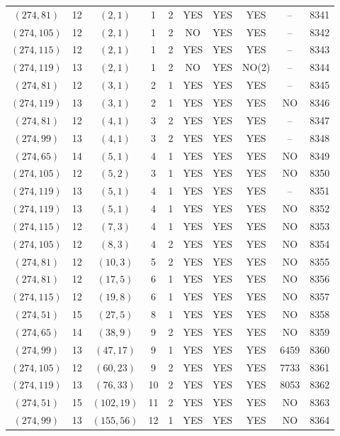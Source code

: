 \begin{longtable}{|c|c|c|c|c|c|c|c|c|c|}
$(274, 81)$ & 12 & $(2, 1)$ & 1 & 2 & YES & YES & YES & -- & 8341\\
$(274, 105)$ & 12 & $(2, 1)$ & 1 & 2 & NO & YES & YES & -- & 8342\\
$(274, 115)$ & 12 & $(2, 1)$ & 1 & 2 & YES & YES & YES & -- & 8343\\
$(274, 119)$ & 13 & $(2, 1)$ & 1 & 2 & NO & YES & NO(2) & -- & 8344\\
$(274, 81)$ & 12 & $(3, 1)$ & 2 & 1 & YES & YES & YES & -- & 8345\\
$(274, 119)$ & 13 & $(3, 1)$ & 2 & 1 & YES & YES & YES & NO & 8346\\
$(274, 81)$ & 12 & $(4, 1)$ & 3 & 2 & YES & YES & YES & -- & 8347\\
$(274, 99)$ & 13 & $(4, 1)$ & 3 & 2 & YES & YES & YES & -- & 8348\\
$(274, 65)$ & 14 & $(5, 1)$ & 4 & 1 & YES & YES & YES & NO & 8349\\
$(274, 105)$ & 12 & $(5, 2)$ & 3 & 1 & YES & YES & YES & NO & 8350\\
$(274, 119)$ & 13 & $(5, 1)$ & 4 & 1 & YES & YES & YES & -- & 8351\\
$(274, 119)$ & 13 & $(5, 1)$ & 4 & 1 & YES & YES & YES & NO & 8352\\
$(274, 115)$ & 12 & $(7, 3)$ & 4 & 1 & YES & YES & YES & NO & 8353\\
$(274, 105)$ & 12 & $(8, 3)$ & 4 & 2 & YES & YES & YES & NO & 8354\\
$(274, 81)$ & 12 & $(10, 3)$ & 5 & 2 & YES & YES & YES & NO & 8355\\
$(274, 81)$ & 12 & $(17, 5)$ & 6 & 1 & YES & YES & YES & NO & 8356\\
$(274, 115)$ & 12 & $(19, 8)$ & 6 & 1 & YES & YES & YES & NO & 8357\\
$(274, 51)$ & 15 & $(27, 5)$ & 8 & 1 & YES & YES & YES & NO & 8358\\
$(274, 65)$ & 14 & $(38, 9)$ & 9 & 2 & YES & YES & YES & NO & 8359\\
$(274, 99)$ & 13 & $(47, 17)$ & 9 & 1 & YES & YES & YES & 6459 & 8360\\
$(274, 105)$ & 12 & $(60, 23)$ & 9 & 2 & YES & YES & YES & 7733 & 8361\\
$(274, 119)$ & 13 & $(76, 33)$ & 10 & 2 & YES & YES & YES & 8053 & 8362\\
$(274, 51)$ & 15 & $(102, 19)$ & 11 & 2 & YES & YES & YES & NO & 8363\\
$(274, 99)$ & 13 & $(155, 56)$ & 12 & 1 & YES & YES & YES & NO & 8364\\

\end{longtable}
